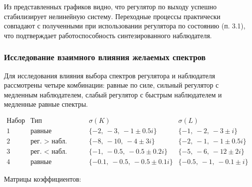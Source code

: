 \documentclass[a4paper,12pt]{article}
\begin{document}
Из представленных графиков видно, что регулятор по выходу успешно стабилизирует нелинейную систему. Переходные процессы практически совпадают с полученными при использовании регулятора по состоянию (п. 3.1), что подтверждает работоспособность синтезированного наблюдателя.
	
	
\subsubsection{Исследование взаимного влияния желаемых спектров}

Для исследования влияния выбора спектров регулятора и наблюдателя рассмотрены четыре комбинации: равные по силе, сильный регулятор с медленным наблюдателем, слабый регулятор с быстрым наблюдателем и медленные равные спектры.

\[
\begin{array}{c|c|c|c}
	\text{Набор} & \text{Тип} & \sigma(K) & \sigma(L) \\ \hline
	1 & \text{равные} & \{-2,\ -3,\ -1 \pm 0.5i\} & \{-1,\ -2,\ -3 \pm i\} \\
	2 & \text{рег. > набл.} & \{-8,\ -10,\ -4 \pm 3i\} & \{-2,\ -1,\ -1 \pm 0.5i\} \\
	3 & \text{рег. < набл.} & \{-1,\ -0.5,\ -0.5 \pm 0.2i\} & \{-5,\ -6,\ -12 \pm 2i\} \\
	4 & \text{равные (медленные)} & \{-0.1,\ -0.5,\ -0.5 \pm 0.1i\} & \{-0.5,\ -1,\ -0.1 \pm i\}
\end{array}
\]

Матрицы коэффициентов:
\end{document}
